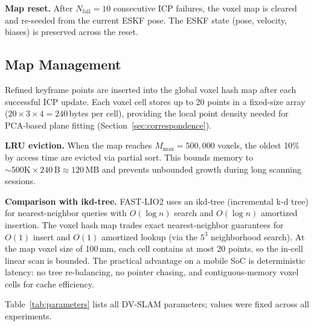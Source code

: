 \textbf{Map reset.}
After $N_\text{fail} = 10$ consecutive ICP failures, the voxel map is cleared and re-seeded from the current ESKF pose.
The ESKF state (pose, velocity, biases) is preserved across the reset.

\subsection{Map Management}
\label{sec:map_mgmt}

Refined keyframe points are inserted into the global voxel hash map after each successful ICP update.
Each voxel cell stores up to 20 points in a fixed-size array ($20 \times 3 \times 4 = 240$\,bytes per cell), providing the local point density needed for PCA-based plane fitting (Section~\ref{sec:correspondence}).

\textbf{LRU eviction.}
When the map reaches $M_\text{max} = 500{,}000$ voxels, the oldest 10\% by access time are evicted via partial sort.
This bounds memory to ${\sim}500\text{K} \times 240\,\text{B} \approx 120$\,MB and prevents unbounded growth during long scanning sessions.

\textbf{Comparison with ikd-tree.}
FAST-LIO2 uses an ikd-tree (incremental k-d tree) for nearest-neighbor queries with $O(\log n)$ search and $O(\log n)$ amortized insertion.
The voxel hash map trades exact nearest-neighbor guarantees for $O(1)$ insert and $O(1)$ amortized lookup (via the $5^3$ neighborhood search).
At the map voxel size of 100\,mm, each cell contains at most 20 points, so the in-cell linear scan is bounded.
The practical advantage on a mobile SoC is deterministic latency: no tree re-balancing, no pointer chasing, and contiguous-memory voxel cells for cache efficiency.

Table~\ref{tab:parameters} lists all DV-SLAM parameters; values were fixed across all experiments.

